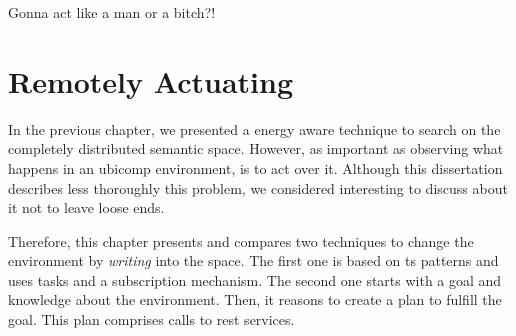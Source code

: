 

\begin{savequote}[50mm]
Gonna act like a man or a bitch?!
\end{savequote}


\chapter{Remotely Actuating}
\label{cha:actuate}
\newcommand{\pathchapfive}{5_actuate}


\ifpdf
    \graphicspath{{\pathchapfive/figures/PNG/}{\pathchapfive/figures/PDF/}{\pathchapfive/figures/}}
\else
    \graphicspath{{\pathchapfive/figures/EPS/}{\pathchapfive/figures/}}
\fi



In the previous chapter, we presented a energy aware technique to search on the completely distributed semantic space.
However, as important as observing what happens in an \ac{ubicomp} environment, is to act over it.
Although this dissertation describes less thoroughly this problem, we considered interesting to discuss about it not to leave loose ends. %


Therefore, this chapter presents and compares two techniques to change the environment by \emph{writing} into the space. %
The first one is based on \ac{ts} patterns and uses tasks and a subscription mechanism.
The second one starts with a goal and knowledge about the environment.
Then, it reasons to create a plan to fulfill the goal.
This plan comprises calls to \ac{rest} services.






